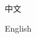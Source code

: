 \documentclass[nofonts]{ctexart}
\begin{document}
\begin{list}{\#\themylist}%
	{}
	\item 中文
	\item English
\end{list}
\end{document}
